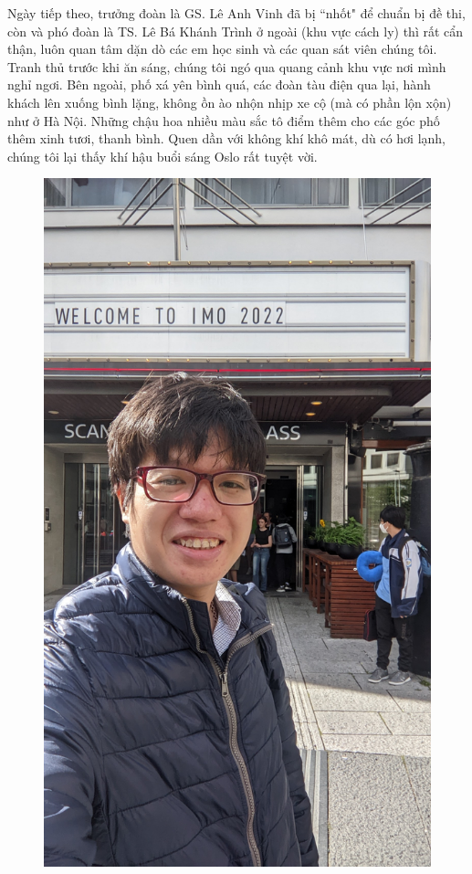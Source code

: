 \begin{multicols}{2}
	\vskip 0.05cm
	Ngày tiếp theo, trưởng đoàn là GS. Lê Anh Vinh đã bị ``nhốt" để chuẩn bị đề thi, còn và phó đoàn là TS. Lê Bá Khánh Trình ở ngoài (khu vực cách ly) thì rất cẩn thận, luôn quan tâm dặn dò các em học sinh và các quan sát viên chúng tôi. Tranh thủ trước khi ăn sáng, chúng tôi ngó qua quang cảnh khu vực nơi mình nghỉ ngơi. Bên ngoài, phố xá yên bình quá, các đoàn tàu điện qua lại, hành khách lên xuống bình lặng, không ồn ào nhộn nhịp xe cộ (mà có phần lộn xộn) như ở Hà Nội. Những chậu hoa nhiều màu sắc tô điểm thêm cho các góc phố thêm xinh tươi, thanh bình. Quen dần với không khí khô mát, dù có hơi lạnh, chúng tôi lại thấy khí hậu buổi sáng Oslo rất tuyệt vời. 
	\begin{figure}[H]
		\vspace*{-5pt}
		\centering
		\captionsetup{labelformat= empty, justification=centering}
		\includegraphics[width= 1\linewidth]{figure8109}

\end{figure}
\end{multicols}
